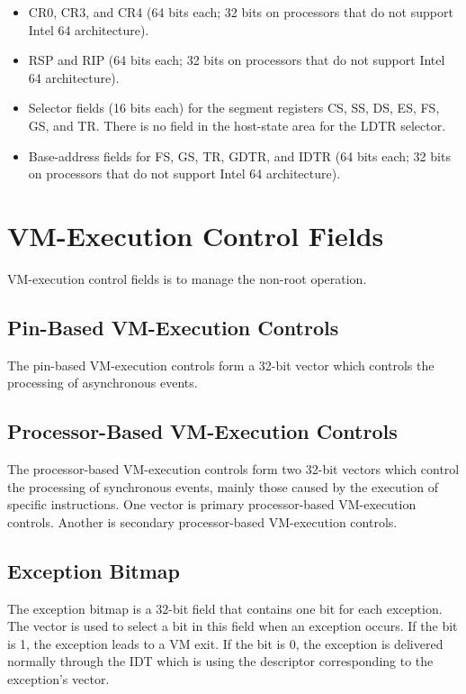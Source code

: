 \documentclass[10pt,draftclsnofoot,journal,compsoc,onecolumn]{IEEEtran}
\begin{document}
	\begin{itemize}
		\item CR0, CR3, and CR4 (64 bits each; 32 bits on processors that do not
		support Intel 64 architecture).
		\item RSP and RIP (64 bits each; 32 bits on processors that do not support
		Intel 64 architecture).
		\item Selector fields (16 bits each) for the segment registers CS, SS, DS, ES,
		FS, GS, and TR. There is no field in the host-state area for the LDTR
		selector.
		\item Base-address fields for FS, GS, TR, GDTR, and IDTR (64 bits each; 32
		bits on processors that do not support Intel 64 architecture).
	\end{itemize}
	
	\section{VM-Execution Control Fields}
	VM-execution control fields is to manage the non-root operation.
	
	\subsection{Pin-Based VM-Execution Controls}
	The pin-based VM-execution controls form a 32-bit vector which controls the processing of asynchronous events.
	
	\subsection{Processor-Based VM-Execution Controls}
	The processor-based VM-execution controls form two 32-bit vectors which control the processing of synchronous events, mainly those caused by the execution of specific instructions. One vector is primary processor-based VM-execution controls. Another is secondary processor-based VM-execution controls.
	
	\subsection{Exception Bitmap}
	The exception bitmap is a 32-bit field that contains one bit for each exception. The vector is used to select a bit in this field when an exception occurs. If the bit is 1, the exception leads to  a VM exit. If the bit is 0, the exception is delivered normally through the IDT which is using the descriptor corresponding to the exception’s vector.
	
\end{document}

